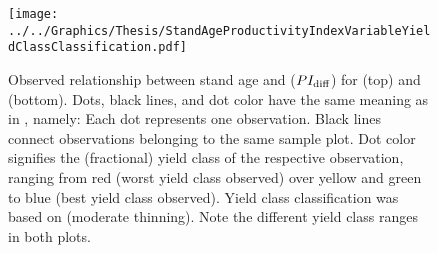 \begin{figure}[t]
  \texttt{[image: ../../Graphics/Thesis/StandAgeProductivityIndexVariableYieldClassClassification.pdf]}
  \caption{Observed relationship between stand age and \ProductivityIndexVariableText{} (\(PI_{\text{diff}}{}\)) for \Beech{} (top) and \Spruce{} (bottom).  Dots, black lines, and dot color have the same meaning as in , namely:  Each dot represents one observation.  Black lines connect observations belonging to the same sample plot.  Dot color signifies the (fractional) yield class of the respective observation, ranging from red (worst yield class observed) over yellow and green to blue (best yield class observed).  Yield class classification was based on \textcite{Schober1995} (moderate thinning).  Note the different yield class ranges in both plots.}
  \label{fig:StandAgeProductivityIndexVariableYieldClassClassification}
\end{figure}


\clearpage{}

